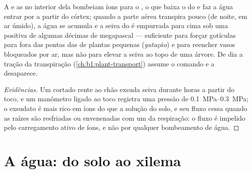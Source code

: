 \begin{proposition}\label{prop:b1:plant-water-minerals:rootpressure}
A  e as  no interior dela bombeiam íons para o ,
o que baixa o  do  e faz a água entrar por
 a partir do córtex; quando a parte aérea transpira pouco (de
noite, em ar úmido), a água se acumula e a seiva do  é empurrada
para cima sob uma \emph{} positiva de algumas décimas
de megapascal --- suficiente para forçar gotículas para fora das
pontas das  de plantas pequenas (\emph{gutação}) e para reencher
vasos bloqueados por ar, mas não para elevar a seiva ao topo de uma
árvore. De dia a tração da transpiração
(\cref{ch:b1:plant-transport}) assume o comando e a 
desaparece.
\end{proposition}
\begin{proof}[Evidências]
Um  cortado rente ao chão exsuda seiva durante horas a partir do
toco, e um manômetro ligado ao toco registra uma pressão de
\qtyrange{0.1}{0.3}{MPa}; o exsudato é mais rico em íons do que a
solução do solo, e seu fluxo cessa quando as raízes são resfriadas ou
envenenadas com um  da respiração: o fluxo é impelido pelo
carregamento ativo de íons, e não por qualquer bombeamento de água.
\end{proof}

\section{A água: do solo ao xilema}

